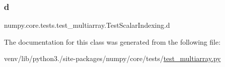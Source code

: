 \subsubsection{\texorpdfstring{d}{d}}
{\footnotesize\ttfamily numpy.\+core.\+tests.\+test\+\_\+multiarray.\+Test\+Scalar\+Indexing.\+d}



The documentation for this class was generated from the following file\+:\begin{DoxyCompactItemize}
\item 
venv/lib/python3./site-\/packages/numpy/core/tests/\hyperlink{core_2tests_2test__multiarray_8py}{test\+\_\+multiarray.\+py}\end{DoxyCompactItemize}
